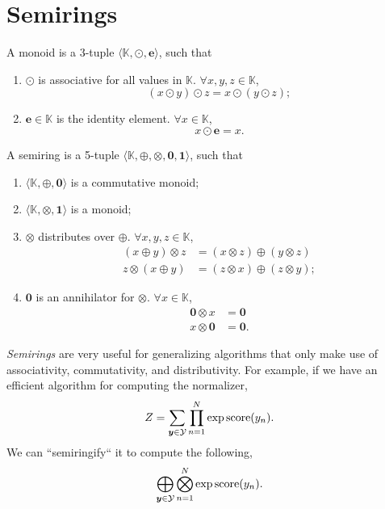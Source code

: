 \section{Semirings} \label{sec:semirings}

\begin{definition}[Monoid]
    A monoid is a 3-tuple $\langle \mathbb{K},\odot,\bm{e} \rangle$, such that
    \begin{enumerate}
        \item $\odot$ is associative for all values in $\mathbb{K}$. $\forall x,y,z
                  \in \mathbb{K}$, \[
                  (x\odot y)\odot z = x\odot (y\odot z);
              \]
        \item $\bm{e}\in \mathbb{K}$ is the identity element. $\forall x \in
                  \mathbb{K}$, \[
                  x \odot \bm{e} = x.
              \]
    \end{enumerate}
\end{definition}

\begin{definition}[Semiring]
    A semiring is a 5-tuple $\langle \mathbb{K},\oplus,\otimes,\bm{0},\bm{1}
        \rangle$, such that
    \begin{enumerate}
        \item $\langle \mathbb{K},\oplus,\bm{0} \rangle$ is a commutative monoid;
        \item $\langle \mathbb{K},\otimes,\bm{1} \rangle$ is a monoid;
        \item $\otimes$ distributes over $\oplus$. $\forall x,y,z\in \mathbb{K}$,
              \begin{align*}
                  (x\oplus y) \otimes z & = (x\otimes z) \oplus (y \otimes z) \\
                  z\otimes (x \oplus y) & = (z\otimes x) \oplus (z\otimes y);
              \end{align*}
        \item $\bm{0}$ is an annihilator for $\otimes$. $\forall x \in \mathbb{K}$,
              \begin{align*}
                  \bm{0} \otimes x & = \bm{0}  \\
                  x \otimes \bm{0} & = \bm{0}.
              \end{align*}
    \end{enumerate}
\end{definition}


\textit{Semirings} are very useful for generalizing algorithms that only make use of
associativity, commutativity, and distributivity. For example, if we have an
efficient algorithm for computing the normalizer, \[
    Z = \sum_{\bm{y}\in\mathcal{Y}} \prod_{n=1}^N \exp \mathrm{score}(y_n).
\]
We can ``semiringify`` it to compute the following, \[
    \bigoplus_{\bm{y}\in\mathcal{Y}} \bigotimes_{n=1}^N \exp \mathrm{score}(y_n).
\]

